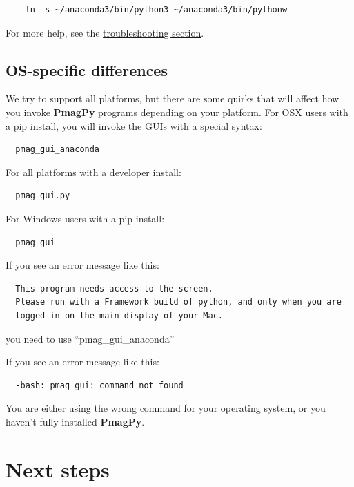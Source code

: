 \documentclass[11pt]{book}
\begin{document}
{\begin{itemize}
\begin{verbatim}
    ln -s ~/anaconda3/bin/python3 ~/anaconda3/bin/pythonw

    \end{verbatim}

\end{itemize}

For more help, see the \href{#trouble}{troubleshooting section}.

    \subsection {OS-specific differences}
    We try to support all platforms, but there are some quirks that will affect how you invoke {\bf PmagPy} programs depending on your platform.  For OSX users with a pip install, you will invoke the GUIs with a special syntax:

\begin{verbatim}
  pmag_gui_anaconda
\end{verbatim}

For all platforms with a developer install:

\begin{verbatim}
  pmag_gui.py
\end{verbatim}

For Windows users with a pip install:

\begin{verbatim}
  pmag_gui
\end{verbatim}


If you see an error message like this:

\begin{verbatim}
  This program needs access to the screen.
  Please run with a Framework build of python, and only when you are
  logged in on the main display of your Mac.
\end{verbatim}

you need to use ``pmag\_gui\_anaconda''

If you see an error message like this:

\begin{verbatim}
  -bash: pmag_gui: command not found
\end{verbatim}

You are either using the wrong command for your operating system, or you haven't fully installed {\bf PmagPy}.

\section{Next steps}

}
\end{document}
